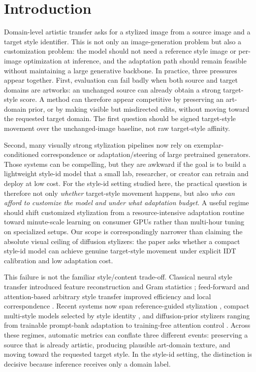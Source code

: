 \documentclass[letterpaper]{article}
\begin{document}
\section{Introduction}
Domain-level artistic transfer asks for a stylized image from a source image and a target style identifier. This is not only an image-generation problem but also a customization problem: the model should not need a reference style image or per-image optimization at inference, and the adaptation path should remain feasible without maintaining a large generative backbone. In practice, three pressures appear together. First, evaluation can fail badly when both source and target domains are artworks: an unchanged source can already obtain a strong target-style score. A method can therefore appear competitive by preserving an art-domain prior, or by making visible but misdirected edits, without moving toward the requested target domain. The first question should be signed target-style movement over the unchanged-image baseline, not raw target-style affinity.

Second, many visually strong stylization pipelines now rely on exemplar-conditioned correspondence or adaptation/steering of large pretrained generators. Those systems can be compelling, but they are awkward if the goal is to build a lightweight style-id model that a small lab, researcher, or creator can retrain and deploy at low cost. For the style-id setting studied here, the practical question is therefore not only \emph{whether} target-style movement happens, but also \emph{who can afford to customize the model and under what adaptation budget}. A useful regime should shift customized stylization from a resource-intensive adaptation routine toward minute-scale learning on consumer GPUs rather than multi-hour tuning on specialized setups. Our scope is correspondingly narrower than claiming the absolute visual ceiling of diffusion stylizers: the paper asks whether a compact style-id model can achieve genuine target-style movement under explicit IDT calibration and low adaptation cost.

This failure is not the familiar style/content trade-off. Classical neural style transfer introduced feature reconstruction and Gram statistics \cite{gatys2016image}; feed-forward and attention-based arbitrary style transfer improved efficiency and local correspondence \cite{huang2017adain,park2019sanet,deng2022stytr2,zheng2024puffnet}. Recent systems now span reference-guided stylization \cite{hong2023aespa,huang2024aesfa,zhang2025hsi,shang2025scsa}, compact multi-style models selected by style identity \cite{liu2024samst}, and diffusion-prior stylizers ranging from trainable prompt-bank adaptation to training-free attention control \cite{zhang2024artbank,chung2024styleid,deng2024zstar,jiang2025sms,xu2025stylessp}. Across these regimes, automatic metrics can conflate three different events: preserving a source that is already artistic, producing plausible art-domain texture, and moving toward the requested target style. In the style-id setting, the distinction is decisive because inference receives only a domain label.
\end{document}
